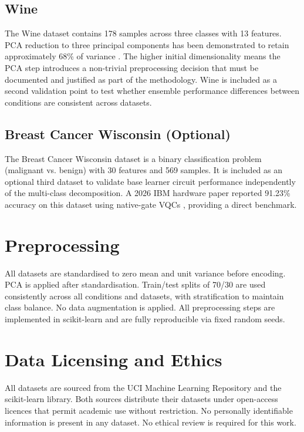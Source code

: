 \documentclass[]{UCD_CS_FYP_Report}
\begin{document}
\subsection{Wine}
The Wine dataset contains 178 samples across three classes with 13 features. PCA reduction to three principal components has been demonstrated to retain approximately 68\% of variance \cite{wine_pca}. The higher initial dimensionality means the PCA step introduces a non-trivial preprocessing decision that must be documented and justified as part of the methodology. Wine is included as a second validation point to test whether ensemble performance differences between conditions are consistent across datasets.

\subsection{Breast Cancer Wisconsin (Optional)}
The Breast Cancer Wisconsin dataset is a binary classification problem (malignant vs. benign) with 30 features and 569 samples. It is included as an optional third dataset to validate base learner circuit performance independently of the multi-class decomposition. A 2026 IBM hardware paper reported 91.23\% accuracy on this dataset using native-gate VQCs \cite{medmnist2026ibm}, providing a direct benchmark.

\section{Preprocessing}

All datasets are standardised to zero mean and unit variance before encoding. PCA is applied after standardisation. Train/test splits of 70/30 are used consistently across all conditions and datasets, with stratification to maintain class balance. No data augmentation is applied. All preprocessing steps are implemented in scikit-learn and are fully reproducible via fixed random seeds.

\section{Data Licensing and Ethics}

All datasets are sourced from the UCI Machine Learning Repository and the scikit-learn library. Both sources distribute their datasets under open-access licences that permit academic use without restriction. No personally identifiable information is present in any dataset. No ethical review is required for this work.
\end{document}

